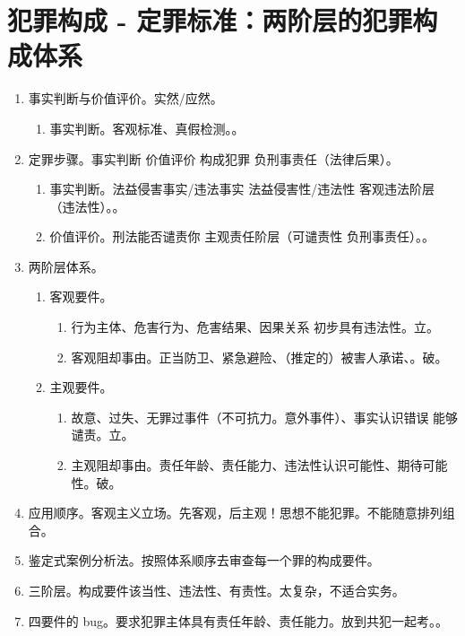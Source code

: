 \section{犯罪构成 - 定罪标准：两阶层的犯罪构成体系}
\begin{enumerate}
  \item 事实判断与价值评价。实然/应然。
        \begin{enumerate}
          \item 事实判断。客观标准、真假检测。。
        \end{enumerate}
  \item 定罪步骤。事实判断 \yjt 价值评价 \yjt 构成犯罪 \yjt 负刑事责任（法律后果）。
        \begin{enumerate}
          \item 事实判断。法益侵害事实/违法事实 \yjt 法益侵害性/违法性 \yjt 客观违法阶层（违法性）。。
          \item 价值评价。刑法能否谴责你 \yjt 主观责任阶层（可谴责性 \bdy 负刑事责任）。。
        \end{enumerate}
  \item 两阶层体系。
        \begin{enumerate}
          \item 客观要件。
                \begin{enumerate}
                  \item 行为主体、危害行为、危害结果、因果关系 \yjt 初步具有违法性。立。
                  \item 客观阻却事由。正当防卫、紧急避险、（推定的）被害人承诺、。破。
                \end{enumerate}
          \item 主观要件。
                \begin{enumerate}
                  \item 故意、过失、无罪过事件（\yi 不可抗力。\er 意外事件）、事实认识错误 \yjt 能够谴责。立。
                  \item 主观阻却事由。责任年龄、责任能力、违法性认识可能性、期待可能性。破。
                \end{enumerate}
        \end{enumerate}
  \item 应用顺序。客观主义立场。先客观，后主观！思想不能犯罪。不能随意排列组合。
  \item 鉴定式案例分析法。按照体系顺序去审查每一个罪的构成要件。
  \item 三阶层。构成要件该当性、违法性、有责性。太复杂，不适合实务。
  \item 四要件的 bug。要求犯罪主体具有责任年龄、责任能力。放到共犯一起考。。
\end{enumerate}
